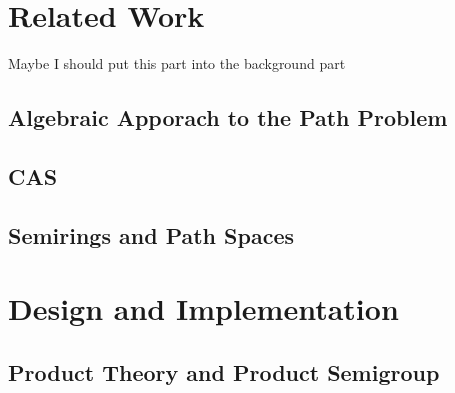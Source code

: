 \documentclass[a4paper,12pt,twoside,openright]{report}
\begin{document}
\chapter{Related Work} 

%
%

Maybe I should put this part into the background part
\section{Algebraic Apporach to the Path Problem}
\section{CAS}
\section{Semirings and Path Spaces}


\chapter{Design and Implementation} 

\section{Product Theory and Product Semigroup}
\end{document}
